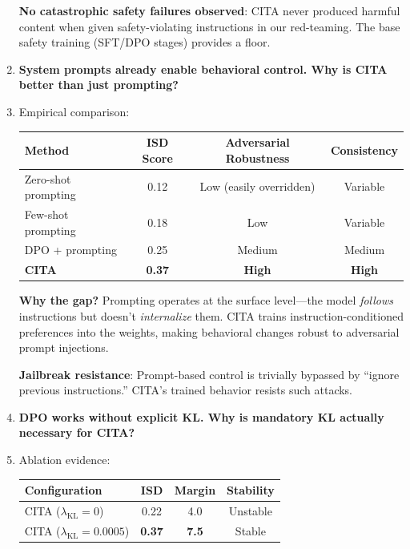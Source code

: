 \begin{enumerate}[label=\textbf{Q\arabic*.}, leftmargin=*, itemsep=8pt]
\textbf{No catastrophic safety failures observed}: CITA never produced harmful content when given safety-violating instructions in our red-teaming. The base safety training (SFT/DPO stages) provides a floor.

\vspace{4mm}

\item[\ding{93}] \textbf{System prompts already enable behavioral control. Why is CITA better than just prompting?}

\item[\ding{224}] Empirical comparison:

\begin{table}[H]
\centering
\small
\begin{tabular}{@{}lccc@{}}
\toprule
\textbf{Method} & \textbf{ISD Score} & \textbf{Adversarial Robustness} & \textbf{Consistency} \\
\midrule
Zero-shot prompting & 0.12 & Low (easily overridden) & Variable \\
\hline
Few-shot prompting & 0.18 & Low & Variable \\
\hline
DPO + prompting & 0.25 & Medium & Medium \\
\hline
\textbf{CITA} & \textbf{0.37} & \textbf{High} & \textbf{High} \\
\bottomrule
\end{tabular}
\end{table}

\textbf{Why the gap?} Prompting operates at the surface level---the model \textit{follows} instructions but doesn't \textit{internalize} them. CITA trains instruction-conditioned preferences into the weights, making behavioral changes robust to adversarial prompt injections.

\textbf{Jailbreak resistance}: Prompt-based control is trivially bypassed by ``ignore previous instructions.'' CITA's trained behavior resists such attacks.

\vspace{4mm}

\item[\ding{93}] \textbf{DPO works without explicit KL. Why is mandatory KL actually necessary for CITA?}

\item[\ding{224}] Ablation evidence:

\begin{table}[H]
\centering
\small
\begin{tabular}{@{}lccc@{}}
\toprule
\textbf{Configuration} & \textbf{ISD} & \textbf{Margin} & \textbf{Stability} \\
\midrule
CITA ($\lambda_{\text{KL}}=0$) & 0.22 & 4.0 & Unstable \\
\hline
CITA ($\lambda_{\text{KL}}=0.0005$) & \textbf{0.37} & \textbf{7.5} & Stable \\
\bottomrule
\end{tabular}
\end{table}


\end{enumerate}
